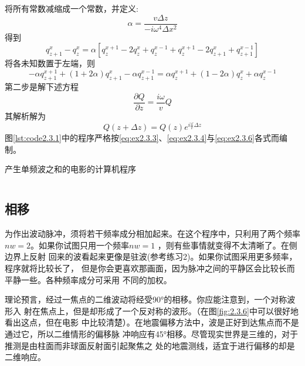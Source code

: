 将所有常数减缩成一个常数，并定义:
\begin{equation}
\alpha=\frac{v\Delta z}{-i\omega^4\Delta x^2}
\label{eq:ex2.3.3}
\end{equation}
得到
\begin{equation*}
q_{z+1}^x-q_z^x=\alpha[q_z^{x+1}-2q_z^x+q_z^{x-1}+q_z^{x+1}-2q_{z+1}^x+q_{z+1}^{x-1}]
\end{equation*}
将各未知数置于左端，则
\begin{equation}
-\alpha q_{z+1}^{x+1}+(1+2\alpha)q_{z+1}^x-\alpha q_{z+1}^{x-1}=\alpha q_z^{x+1}+(1-2\alpha)q_z^x+
\alpha q_z^{x-1}
\label{eq:ex2.3.4}
\end{equation}
第二步是解下述方程
\begin{equation}
\frac{\partial Q}{\partial z}=\frac{i\omega}{v}Q
\label{eq:ex2.3.5}
\end{equation}
其解析解为
\begin{equation}
Q(z+\Delta z)=Q(z)e^{i\frac{\omega}{v}\Delta z}
\label{eq:ex2.3.6}
\end{equation}
图\ref{lst:code2.3.1}中的程序严格按\ref{eq:ex2.3.3}、\ref{eq:ex2.3.4}与\ref{eq:ex2.3.6}各式而编制。
\begin{listing}[H]
  \caption{产生单频波之和的电影的计算机程序}
  \inputminted{Fortran}{timespace/code2-3-1.f90}
  \label{lst:code2.3.1}
\end{listing}
\subsection{相移}
为作出波动脉冲，须将若干频率成分相加起来。在这个程序中，只利用了两个频率
$nw=2$。如果你试图只用一个频率$nw =1$
，则有些事情就变得不太清晰了。在侧边界上反射
回来的波看起来更像是驻波(参考练习2)。如果你试图采用更多频率，程序就将比较长了，
但是你会更喜欢那画面，因为脉冲之间的平静区会比较长而平静一些。各种频率成分可采用
不同的加权。

理论预言，经过一焦点的二维波动将经受90°的相移。你应能注意到，一个对称波形入
射在焦点上，但是却形成了一个反对称的波形。（在图\ref{fig:2.3.6}中可以很好地看出这点，但在电影
中比较清楚）。在地震偏移方法中，波是正好到达焦点而不是通过它，所以二维情形的偏移脉
冲响应有45°相移。尽管现实世界是三维的，对于推测是由柱面而非球面反射面引起聚焦之
处的地震测线，适宜于进行偏移的却是二维响应。


